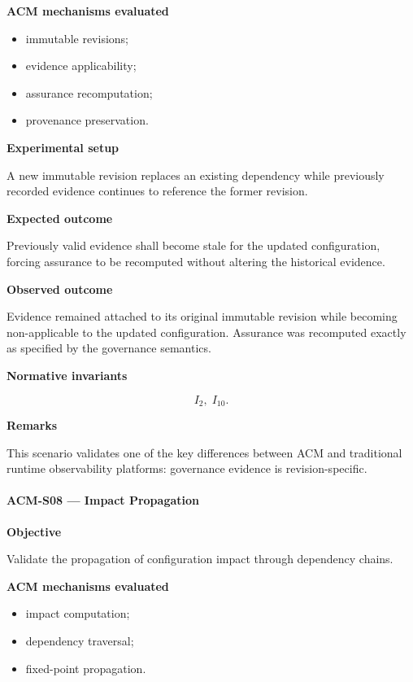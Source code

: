 \documentclass[10pt]{article}
\begin{document}
\textbf{ACM mechanisms evaluated}

\begin{itemize}
    \item immutable revisions;
    \item evidence applicability;
    \item assurance recomputation;
    \item provenance preservation.
\end{itemize}

\textbf{Experimental setup}

A new immutable revision replaces an existing dependency while previously
recorded evidence continues to reference the former revision.

\textbf{Expected outcome}

Previously valid evidence shall become stale for the updated configuration,
forcing assurance to be recomputed without altering the historical evidence.

\textbf{Observed outcome}

Evidence remained attached to its original immutable revision while becoming
non-applicable to the updated configuration. Assurance was recomputed exactly
as specified by the governance semantics.

\textbf{Normative invariants}

\[
I_2,\;
I_{10}.
\]

\textbf{Remarks}

This scenario validates one of the key differences between ACM and traditional
runtime observability platforms: governance evidence is revision-specific.

\paragraph{ACM-S08 --- Impact Propagation}

\textbf{Objective}

Validate the propagation of configuration impact through dependency chains.

\textbf{ACM mechanisms evaluated}

\begin{itemize}
    \item impact computation;
    \item dependency traversal;
    \item fixed-point propagation.
\end{itemize}
\end{document}
